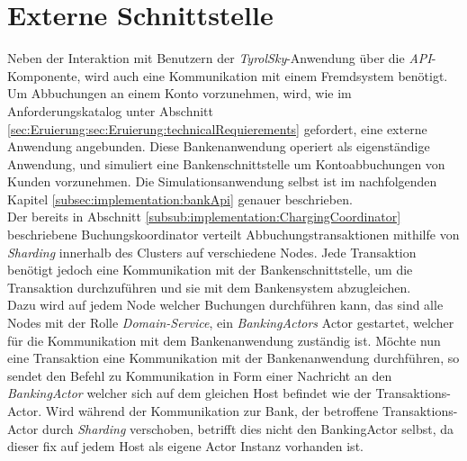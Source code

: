 \section{Externe Schnittstelle}
\label{sec:implementation:externalApi}
Neben der Interaktion mit Benutzern der \textit{TyrolSky}-Anwendung über die \textit{API}-Komponente, wird auch eine Kommunikation mit einem Fremdsystem benötigt. Um Abbuchungen an einem Konto vorzunehmen, wird, wie im Anforderungskatalog unter Abschnitt \ref{sec:Eruierung:sec:Eruierung:technicalRequierements} gefordert, eine externe Anwendung angebunden. Diese Bankenanwendung operiert als eigenständige Anwendung, und simuliert eine Bankenschnittstelle um Kontoabbuchungen von Kunden vorzunehmen. Die Simulationsanwendung selbst ist im nachfolgenden Kapitel \ref{subsec:implementation:bankApi} genauer beschrieben. \\
Der bereits in Abschnitt \ref{subsub:implementation:ChargingCoordinator}  beschriebene Buchungskoordinator verteilt Abbuchungstransaktionen mithilfe von \textit{Sharding} innerhalb des Clusters auf verschiedene Nodes. Jede Transaktion benötigt jedoch eine Kommunikation mit der Bankenschnittstelle, um die Transaktion durchzuführen und sie mit dem Bankensystem abzugleichen.  \\
Dazu wird auf jedem Node welcher Buchungen durchführen kann, das sind alle Nodes mit der Rolle \textit{Domain-Service}, ein \textit{BankingActors} Actor gestartet, welcher für die Kommunikation mit dem Bankenanwendung zuständig ist.
 Möchte nun eine Transaktion eine Kommunikation mit der Bankenanwendung durchführen, so sendet den Befehl zu Kommunikation in Form einer Nachricht an den \textit{BankingActor} welcher sich auf dem gleichen Host befindet wie der Transaktions-Actor. Wird während der Kommunikation zur Bank, der betroffene Transaktions-Actor durch \textit{Sharding} verschoben, betrifft dies nicht den BankingActor selbst, da dieser fix auf jedem Host als eigene Actor Instanz vorhanden ist. 

